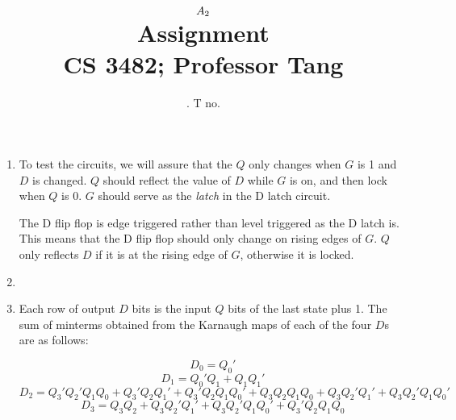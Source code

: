 \documentclass[11pt]{article}
\title{
	$A_{2}$ \\
	{\large Assignment \ass\\
	CS 3482; Professor Tang}
}
\author{
	\name. T no. \tno
}
\begin{document}
\maketitle

\begin{enumerate}
\item {
	To test the circuits, we will assure that the $Q$ only changes when $G$
	is 1 and $D$ is changed. $Q$ should reflect the value of $D$ while $G$
	is on, and then lock when $Q$ is 0. $G$ should serve as the {\it latch}
	in the D latch circuit.

	The D flip flop is edge triggered rather than level triggered as the
	D latch is. This means that the D flip flop should only change on rising
	edges of $G$. $Q$ only reflects $D$ if it is at the rising edge of $G$,
	otherwise it is locked.
}
\item{}
\item{
	Each row of output $D$ bits is the input $Q$ bits of the last state
	plus 1. The sum of minterms obtained from the Karnaugh maps of each of
	the four $D$s are as follows:

	\[
		D_{0}=Q_{0}'
	\] \[
		D_{1}=Q_{0}'Q_{1}+Q_{1}Q_{1}'
	\] \[
		D_{2}=Q_{3}'Q_{2}'Q_{1}Q_{0}+Q_{3}'Q_{2}Q_{1}'+Q_{3}'Q_{2}Q_{1}Q_{0}'
			+Q_{3}Q_{2}Q_{1}Q_{0}+Q_{3}Q_{2}'Q_{1}'+Q_{3}Q_{2}'Q_{1}Q_{0}'
	\] \[
		D_{3}=Q_{3}Q_{2}+Q_{3}Q_{2}'Q_{1}'+Q_{3}Q_{2}'Q_{1}Q_{0}'
			+Q_{3}'Q_{2}Q_{1}Q_{0}
	\]
}

\end{enumerate}
\end{document}
